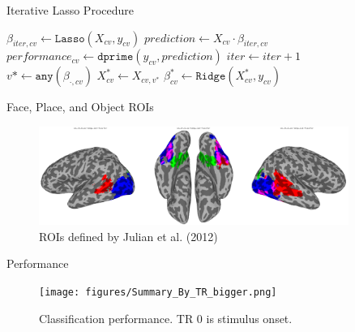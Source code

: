 \documentclass[final]{beamer}
\newlength{\sepwid}
\newlength{\introcolwid}
\begin{document}
\begin{frame}[t]
\begin{columns}[t]
\begin{column}{\introcolwid}
   		\begin{block}{Iterative Lasso Procedure}
			{\small\begin{algorithmic}
				\Repeat
						\State $\beta_{iter,cv} \gets \mathtt{Lasso}(X_{cv},y_{cv})$
						\State $prediction \gets X_{cv} \cdot \beta_{iter,cv}$
						\State $performance_{cv} \gets \mathtt{dprime}(y_{cv},prediction)$
					\EndFor
					\State $iter \gets iter+1$
					\State $v* \gets \mathtt{any}(\beta_{\cdot,cv})$
					\State $X_{cv}^* \gets X_{cv,v^*}$
					\State $\beta_{cv}^* \gets \mathtt{Ridge}(X_{cv}^*,y_{cv})$
				\EndFor
			\end{algorithmic}}
  		\end{block}
  		
		\begin{block}{Face, Place, and Object ROIs}
			\begin{figure}
				\includegraphics[width=\textwidth]{figures/ROIs.png}
				\caption{ROIs defined by Julian et al. (2012)\cite{Julian20122357}}
			\end{figure}
		\end{block}
  				
  		\begin{block}{Performance}
			\begin{figure}
				\texttt{[image: figures/Summary\_By\_TR\_bigger.png]}
				\caption{Classification performance. TR 0 is stimulus onset.}
			\end{figure}			
  		\end{block}
   	\end{column}

    \begin{column}{\sepwid}\end{column}			%
    \begin{column}{\introcolwid}					  %
		

\end{column}
\end{columns}
\end{frame}
\end{document}
